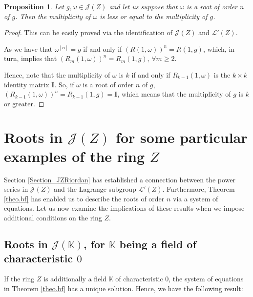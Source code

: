 \documentclass[preprint,12pt]{elsarticle}
\newtheorem{prop}[thm]{Proposition}
\begin{document}
\begin{prop} \label{Prop2.2} Let $g,\omega\in\mathcal J(Z)$ and let us suppose that $\omega$ is a root of order $n$ of $g$. Then the multiplicity of $\omega$ is less or equal to the multiplicity of $g$.


\end{prop}

\begin{proof} This can be easily proved via the identification of $\mathcal J(Z)$ and $\mathcal L'(Z)$. 

As we have that $\omega^{[n]} = g$ if and only if $(R(1,\omega))^n = R(1,g)$, which, in turn, implies that $(R_{m}(1,\omega))^n=R_{m}(1,g)$, $\forall m \geq 2$.

Hence, note that the multiplicity of $\omega$ is $k$ if and only if $R_{k-1}(1,\omega)$ is the $k\times k$ identity matrix $\bm I$. So, if $\omega$ is a root of order $n$ of $g$, $(R_{k-1}(1,\omega))^n=R_{k-1}(1,g)=\bm I$, which means that the multiplicity of $g$ is $k$ or greater.
\end{proof}




\section{Roots in \texorpdfstring{$\mathcal J(Z)$}{J(Z)} for some particular examples of the ring \texorpdfstring{$Z$}{Z}}\label{Section_JZ}


Section \ref{Section_JZRiordan} has established a connection between the power series in $\mathcal J(Z)$ and the Lagrange subgroup $\mathcal L'(Z)$. Furthermore, Theorem \ref{theo.bf} has enabled us to describe the roots of order $n$ via a system of equations. Let us now examine the implications of these results when we impose additional 
conditions on the ring \( Z \).

\subsection{Roots in \texorpdfstring{$\mathcal J(\mathbb K)$}{J(K)}, for \texorpdfstring{$\mathbb K$}{K}   being a field of characteristic \texorpdfstring{$0$}{0}}

If the ring $Z$ is additionally a field $\mathbb K$ of characteristic $0$, the system of equations in Theorem \ref{theo.bf} has a unique solution. Hence, we have the following result:
\end{document}
